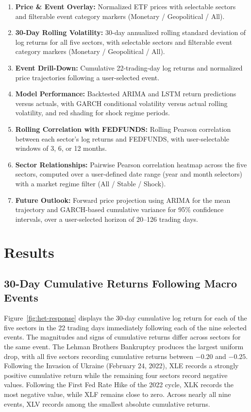 \documentclass[12pt]{article}
\begin{document}
\begin{enumerate}
    \item \textbf{Price \& Event Overlay:} Normalized ETF prices with selectable sectors and filterable event category markers (Monetary / Geopolitical / All).
    \item\textbf{30-Day Rolling Volatility:} 30-day annualized rolling standard deviation of log returns for all five sectors, with selectable sectors and filterable event category markers (Monetary / Geopolitical / All).
    \item \textbf{Event Drill-Down:} Cumulative 22-trading-day log returns and normalized price trajectories following a user-selected event.
    \item \textbf{Model Performance:} Backtested ARIMA and LSTM return predictions versus actuals, with GARCH conditional volatility versus actual rolling volatility, and red shading for shock regime periods.
    \item \textbf{Rolling Correlation with FEDFUNDS:} Rolling Pearson correlation between each sector's log returns and FEDFUNDS, with user-selectable windows of 3, 6, or 12 months.
    \item \textbf{Sector Relationships:} Pairwise Pearson correlation heatmap across the five sectors, computed over a user-defined date range (year and month selectors) with a market regime filter (All / Stable / Shock). 
    \item \textbf{Future Outlook:} Forward price projection using ARIMA for the mean trajectory and GARCH-based cumulative variance for 95\% confidence intervals, over a user-selected horizon of 20--126 trading days.
\end{enumerate}

\section{Results}

\subsection{30-Day Cumulative Returns Following Macro Events}

Figure~\ref{fig:het-response} displays the 30-day cumulative log return for each of the five sectors in the 22 trading days immediately following each of the nine selected events. The magnitudes and signs of cumulative returns differ across sectors for the same event. The Lehman Brothers Bankruptcy produces the largest uniform drop, with all five sectors recording cumulative returns between $-0.20$ and $-0.25$. Following the Invasion of Ukraine (February 24, 2022), XLE records a strongly positive cumulative return while the remaining four sectors record negative values. Following the First Fed Rate Hike of the 2022 cycle, XLK records the most negative value, while XLF remains close to zero. Across nearly all nine events, XLV records among the smallest absolute cumulative returns.
\end{document}
